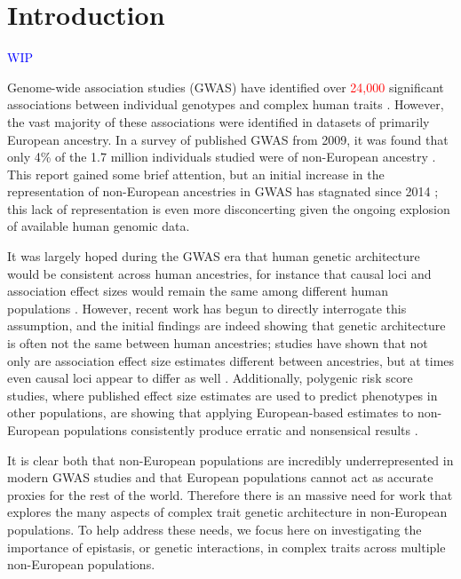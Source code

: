 \documentclass[12pt,a4paper]{article}
\begin{document}
\linenumbers

\section{Introduction}\label{InterPath-Introduction}

\textcolor{blue}{WIP}

Genome-wide association studies (GWAS) have identified over \textcolor{red}{24,000} significant associations between individual genotypes and complex human traits \citep{Buniello2019}. However, the vast majority of these associations were identified in datasets of primarily European ancestry. In a survey of published GWAS from 2009, it was found that only 4\% of the 1.7 million individuals studied were of non-European ancestry \citep{Need2009}. This report gained some brief attention, but an initial increase in the representation of non-European ancestries in GWAS has stagnated since 2014 \citep{Popejoy2016,Martin2019}; this lack of representation is even more disconcerting given the ongoing explosion of available human genomic data. 

It was largely hoped during the GWAS era that human genetic architecture would be consistent across human ancestries, for instance that causal loci and association effect sizes would remain the same among different human populations \citep{Need2009,Pulit2010,Bustamante2011,Bien2019}. However, recent work has begun to directly interrogate this assumption, and the initial findings are indeed showing that genetic architecture is often not the same between human ancestries; studies have shown that not only are association effect size estimates different between ancestries, but at times even causal loci appear to differ as well \citep{Dumitrescu2011,Carlson2013,Kuchenbaecker2019,Wojcik2019}. Additionally, polygenic risk score studies, where published effect size estimates are used to predict phenotypes in other populations, are showing that applying European-based estimates to non-European populations consistently produce erratic and nonsensical results \citep{Martin2017,Duncan2019,Kerminen2019,Rosenberg2019}.

It is clear both that non-European populations are incredibly underrepresented in modern GWAS studies and that European populations cannot act as accurate proxies for the rest of the world. Therefore there is an massive need for work that explores the many aspects of complex trait genetic architecture in non-European populations. To help address these needs, we focus here on investigating the importance of epistasis, or genetic interactions, in complex traits across multiple non-European populations. 
\end{document}
